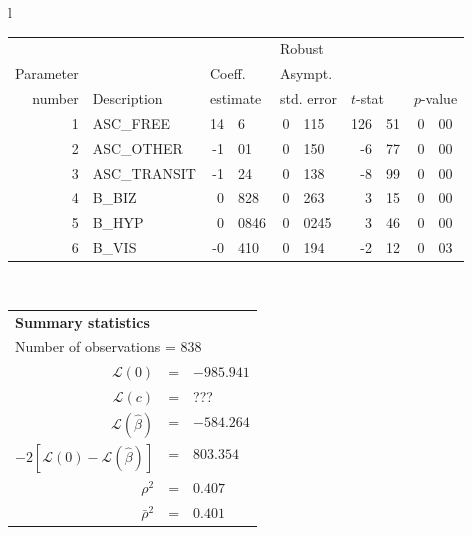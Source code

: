   \begin{tabular}{l}
\begin{tabular}{rlr@{.}lr@{.}lr@{.}lr@{.}l}
         &                       &   \multicolumn{2}{l}{}    & \multicolumn{2}{l}{Robust}  &     \multicolumn{4}{l}{}   \\
Parameter &                       &   \multicolumn{2}{l}{Coeff.}      & \multicolumn{2}{l}{Asympt.}  &     \multicolumn{4}{l}{}   \\
number &  Description                     &   \multicolumn{2}{l}{estimate}      & \multicolumn{2}{l}{std. error}  &   \multicolumn{2}{l}{$t$-stat}  &   \multicolumn{2}{l}{$p$-value}   \\

\hline

1 & ASC\_FREE & 14&6 & 0&115 & 126&51 & 0&00 \\
2 & ASC\_OTHER & -1&01 & 0&150 & -6&77 & 0&00 \\
3 & ASC\_TRANSIT & -1&24 & 0&138 & -8&99 & 0&00 \\
4 & B\_BIZ & 0&828 & 0&263 & 3&15 & 0&00 \\
5 & B\_HYP & 0&0846 & 0&0245 & 3&46 & 0&00 \\
6 & B\_VIS & -0&410 & 0&194 & -2&12 & 0&03 \\
\hline

\end{tabular}
\\
\begin{tabular}{rcl}
\multicolumn{3}{l}{\bf Summary statistics}\\
\multicolumn{3}{l}{ Number of observations = $838$} \\
 $\mathcal{L}(0)$ &=&  $-985.941$ \\
 $\mathcal{L}(c)$ &=& ???\\
 $\mathcal{L}(\hat{\beta})$ &=& $-584.264 $  \\
 $-2[\mathcal{L}(0) -\mathcal{L}(\hat{\beta})]$ &=& $803.354$ \\
    $\rho^2$ &=&   $0.407$ \\
    $\bar{\rho}^2$ &=&    $0.401$ \\
\end{tabular}
\end{tabular}

